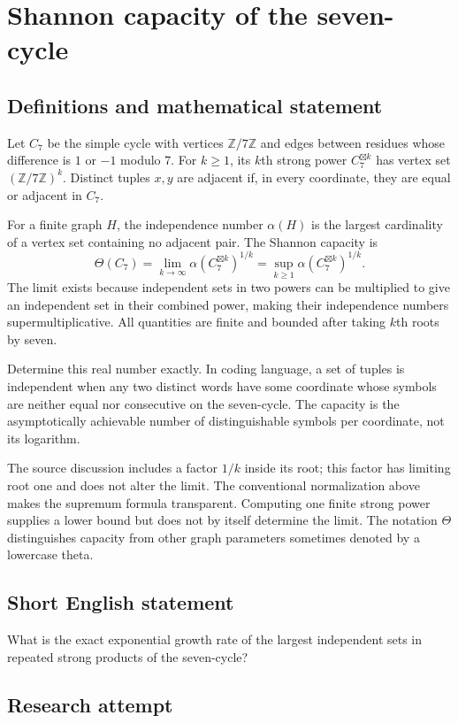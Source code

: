 \documentclass[11pt,a4paper]{article}
\begin{document}
\section*{Shannon capacity of the seven-cycle}\label{statement}

\subsection{Definitions and mathematical statement}
Let $C_7$ be the simple cycle with vertices $\mathbb Z/7\mathbb Z$ and
edges between residues whose difference is $1$ or $-1$ modulo $7$.
For $k\ge1$, its $k$th strong power $C_7^{\boxtimes k}$ has vertex set
$(\mathbb Z/7\mathbb Z)^k$. Distinct tuples $x,y$ are adjacent if,
in every coordinate, they are equal or adjacent in $C_7$.

For a finite graph $H$, the independence number $\alpha(H)$ is the
largest cardinality of a vertex set containing no adjacent pair.
The Shannon capacity is
\[
 \Theta(C_7)=\lim_{k\to\infty}
       \alpha(C_7^{\boxtimes k})^{1/k}
       =\sup_{k\ge1}\alpha(C_7^{\boxtimes k})^{1/k}.
\]
The limit exists because independent sets in two powers can be multiplied
to give an independent set in their combined power, making their
independence numbers supermultiplicative. All quantities are finite and
bounded after taking $k$th roots by seven.

Determine this real number exactly. In coding language, a set of tuples
is independent when any two distinct words have some coordinate whose
symbols are neither equal nor consecutive on the seven-cycle.
The capacity is the asymptotically achievable number of distinguishable
symbols per coordinate, not its logarithm.

The source discussion includes a factor $1/k$ inside its root; this
factor has limiting root one and does not alter the limit. The conventional
normalization above makes the supremum formula transparent. Computing one
finite strong power supplies a lower bound but does not by itself
determine the limit. The notation $\Theta$ distinguishes capacity from
other graph parameters sometimes denoted by a lowercase theta.
\subsection{Short English statement}
What is the exact exponential growth rate of the largest independent sets in repeated strong products of the seven-cycle?
\subsection{Research attempt}
\end{document}
